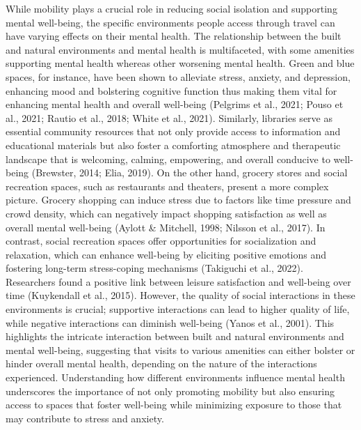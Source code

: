 \documentclass[
  letterpaper,
  number,
  review,
  3p]{elsarticle}
\begin{document}
While mobility plays a crucial role in reducing social isolation and
supporting mental well-being, the specific environments people access
through travel can have varying effects on their mental health. The
relationship between the built and natural environments and mental
health is multifaceted, with some amenities supporting mental health
whereas other worsening mental health. Green and blue spaces, for
instance, have been shown to alleviate stress, anxiety, and depression,
enhancing mood and bolstering cognitive function thus making them vital
for enhancing mental health and overall well-being (Pelgrims et al.,
2021; Pouso et al., 2021; Rautio et al., 2018; White et al., 2021).
Similarly, libraries serve as essential community resources that not
only provide access to information and educational materials but also
foster a comforting atmosphere and therapeutic landscape that is
welcoming, calming, empowering, and overall conducive to well-being
(Brewster, 2014; Elia, 2019). On the other hand, grocery stores and
social recreation spaces, such as restaurants and theaters, present a
more complex picture. Grocery shopping can induce stress due to factors
like time pressure and crowd density, which can negatively impact
shopping satisfaction as well as overall mental well-being (Aylott \&
Mitchell, 1998; Nilsson et al., 2017). In contrast, social recreation
spaces offer opportunities for socialization and relaxation, which can
enhance well-being by eliciting positive emotions and fostering
long-term stress-coping mechanisms (Takiguchi et al., 2022). Researchers
found a positive link between leisure satisfaction and well-being over
time (Kuykendall et al., 2015). However, the quality of social
interactions in these environments is crucial; supportive interactions
can lead to higher quality of life, while negative interactions can
diminish well-being (Yanos et al., 2001). This highlights the intricate
interaction between built and natural environments and mental
well-being, suggesting that visits to various amenities can either
bolster or hinder overall mental health, depending on the nature of the
interactions experienced. Understanding how different environments
influence mental health underscores the importance of not only promoting
mobility but also ensuring access to spaces that foster well-being while
minimizing exposure to those that may contribute to stress and anxiety.
\end{document}
